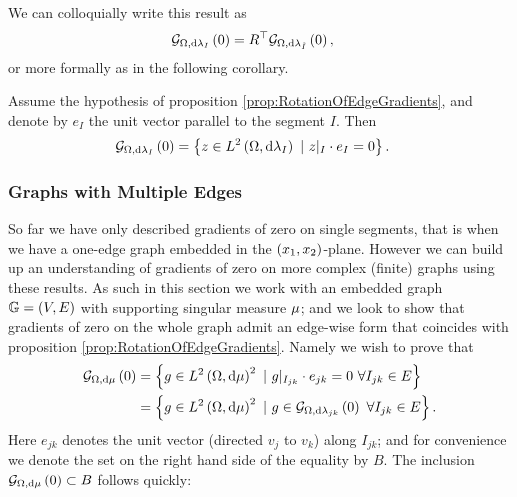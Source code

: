 We can colloquially write this result as
\begin{align*}
	\mathcal{G}_{ \Omega, \mathrm{d}\lambda_I}\left( 0 \right) &= R^\top\mathcal{G}_{ \Omega, \mathrm{d}\lambda_{\tilde{I}}}\left( 0 \right),
\end{align*}
or more formally as in the following corollary.
\begin{cory} \label{cory:Grad0SingleEdge}
	Assume the hypothesis of proposition \ref{prop:RotationOfEdgeGradients}, and denote by $e_I$ the unit vector parallel to the segment $I$.
	Then
	\begin{align*}
		\mathcal{G}_{ \Omega, \mathrm{d}\lambda_I}\left( 0 \right) &= \left\{ z\in L^{2}\left( \Omega,\mathrm{d}\lambda_I \right) \ \vert \ z\vert_{I}\cdot e_I = 0 \right\}.
	\end{align*}
\end{cory}

\subsubsection{Graphs with Multiple Edges}
So far we have only described gradients of zero on single segments, that is when we have a one-edge graph embedded in the $\left( x_1,x_2 \right)$-plane.
However we can build up an understanding of gradients of zero on more complex (finite) graphs using these results.
As such in this section we work with an embedded graph $\mathbb{G} = \left( V,E \right)$ with supporting singular measure $\mu$; and we look to show that gradients of zero on the whole graph admit an edge-wise form that coincides with proposition \ref{prop:RotationOfEdgeGradients}.
Namely we wish to prove that
\begin{align*}
	\gradZero{\ddom}{\ddmes} &= \clbracs{g\in\ltwo{\ddom}{\ddmes}^2 \ \vert \ g\vert_{I_{jk}}\cdot e_{jk}=0 \ \forall I_{jk}\in E} \\
	&= \clbracs{g\in\ltwo{\ddom}{\ddmes}^2 \ \vert \ g\in\gradZero{\ddom}{\lambda_{jk}} \ \forall I_{jk}\in E}.
\end{align*}
Here $e_{jk}$ denotes the unit vector (directed $v_j$ to $v_k$) along $I_{jk}$; and for convenience we denote the set on the right hand side of the equality by $B$.
The inclusion $\mathcal{G}_{ \Omega, \mathrm{d}\mu}\left( 0 \right) \subset B$ follows quickly:

